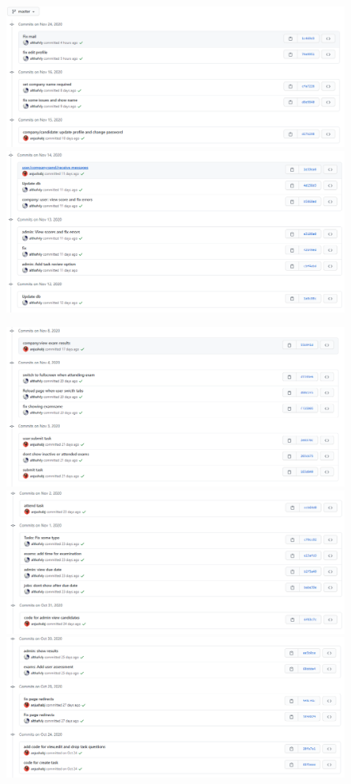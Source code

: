 \documentclass[a4paper,12pt]{report}
\begin{document}
\begin{figure}[bph]
	\centering
	\includegraphics[width=.8\linewidth]{img/screenshots/git/1}
	\includegraphics[width=.8\linewidth]{img/screenshots/git/2}
\end{figure}
\begin{figure}[bph]
	\centering
	\includegraphics[width=.8\linewidth]{img/screenshots/git/3}
	\includegraphics[width=.8\linewidth]{img/screenshots/git/4}
	\includegraphics[width=.8\linewidth]{img/screenshots/git/5}
\end{figure}
\end{document}
